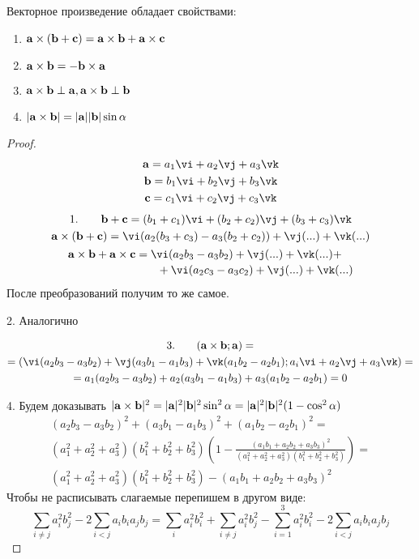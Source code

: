\documentclass[main]{subfiles}
\begin{document}
\begin{theorem}
    Векторное произведение обладает свойствами:
    \begin{enumerate}
        \item $\mathbf{a} \times (\mathbf{b} + \mathbf{c}) = \mathbf{a} \times \mathbf{b} + \mathbf{a} \times \mathbf{c}$
        \item $\mathbf{a} \times \mathbf{b} = -\mathbf{b} \times \mathbf{a}$
        \item $\mathbf{a} \times \mathbf{b} \perp \mathbf{a}, \mathbf{a} \times \mathbf{b} \perp \mathbf{b}$
        \item $|\mathbf{a} \times \mathbf{b}| = |\mathbf{a}||\mathbf{b}|\sin\alpha$
    \end{enumerate}
\end{theorem}
\begin{proof}
    \begin{gather*}
        \va = a_1 \vi + a_2 \vj + a_3 \vk\\
        \vb = b_1 \vi + b_2 \vj + b_3 \vk\\
        \vc = c_1 \vi + c_2 \vj + c_3 \vk
    \end{gather*}
    \begin{gather*}
        1. \qquad \vb+\vc = (b_1 + c_1) \vi + (b_2+c_2) \vj + (b_3+c_3)\vk\\
        \va \times (\vb+\vc) = \vi (a_2(b_3+c_3) - a_3 (b_2+c_2))+\vj(...)+\vk(...)\\
        \begin{multlined}
            \va \times \vb + \va \times \vc = \vi (a_2 b_3 - a_3 b_2)+\vj(...)+\vk(...)+\\
            +\vi (a_2 c_3 - a_3 c_2)+\vj(...)+\vk(...)
        \end{multlined}
    \end{gather*}
    После преобразований получим то же самое.

    2. Аналогично

    \begin{multline*}
        3. \qquad (\va\times\vb; \va) = \\
        = (\vi (a_2 b_3 - a_3 b_2)+ \vj (a_3 b_1 - a_1 b_3) + \vk (a_1 b_2 - a_2 b_1);
        a_i \vi + a_2 \vj + a_3 \vk) = \\
        =a_1 (a_2 b_3 - a_3 b_2)+ a_2 (a_3 b_1 - a_1 b_3) + a_3 (a_1 b_2 - a_2 b_1) = 0
    \end{multline*}

    4. Будем доказывать
    $|\mathbf{a} \times \mathbf{b}|^2 = |\mathbf{a}|^2 |\mathbf{b}|^2 \sin^2 \alpha = |\mathbf{a}|^2 |\mathbf{b}|^2 (1 - \cos^2 \alpha)$
    \begin{multline*}
        (a_2 b_3 - a_3 b_2)^2+(a_3 b_1 - a_1 b_3)^2+(a_1 b_2 - a_2 b_1)^2 =\\
        (a_1^2 + a_2^2 + a_3^2)(b_1^2 + b_2^2 + b_3^2)\left(1 -
        \frac{(a_1 b_1 + a_2 b_2 + a_3 b_3)^2}{(a_1^2 + a_2^2 + a_3^2)(b_1^2 + b_2^2 + b_3^2)}\right)=\\
        (a_1^2 + a_2^2 + a_3^2)(b_1^2 + b_2^2 + b_3^2) - (a_1 b_1 + a_2 b_2 + a_3 b_3)^2
    \end{multline*}
    Чтобы не расписывать слагаемые перепишем в другом виде:
    \[\sum_{i\neq j} a_i^2 b_j^2 - 2 \sum_{i<j} a_i b_i a_j b_j =
        \sum_i a_i^2 b_i^2 + \sum_{i \neq j} a_i^2 b_j^2
        - \sum_{i=1}^3 a_i^2 b_i^2 - 2 \sum_{i<j} a_i b_i a_j b_j\]
\end{proof}
\end{document}

